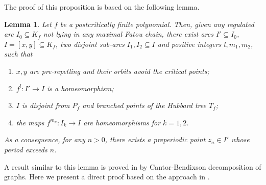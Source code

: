 \documentclass[a4paper,reqno,times, 11pt]{amsart}
\newtheorem{lemma}[theorem]{Lemma}
\theoremstyle{remark}
\theoremstyle{plain}
\numberwithin{equation}{section}
\begin{document}
	The proof of this proposition is based on the following lemma.
	
	
	
	
	
	\begin{lemma}\label{lem:non-cluster}
		Let $f$ be a postcritically finite polynomial. Then, given any regulated arc $I_0\subseteq K_f$ not lying in any maximal Fatou chain, there exist arcs $I'\subseteq I_0$, $ I=[x,y]\subseteq K_f$, two disjoint sub-arcs $I_1, I_2\subseteq I$ and positive integers $l, m_1, m_2$, such that
		\begin{enumerate}
			\item $x,y$ are pre-repelling and their orbits avoid the critical points;
			\item $f^l:I'\to I$ is a homeomorphism;
			\item $I$ is disjoint from $P_f$ and branched points of the Hubbard tree $T_f$;
			\item the maps $f^{m_k}:I_k\to I$ are homeomorphisms for $k=1, 2$.
		\end{enumerate}
		As a consequence, for any $n>0$, there exists a preperiodic point $z_n\in I'$ whose period exceeds $n$.
	\end{lemma}
	A result similar to this lemma is proved in \cite[Lemma 6.4]{LP} by Cantor-Bendixson decomposition of graphs. Here we present a direct proof based on the approach in \cite[Lemma 9.14]{GT}.
\end{document}
